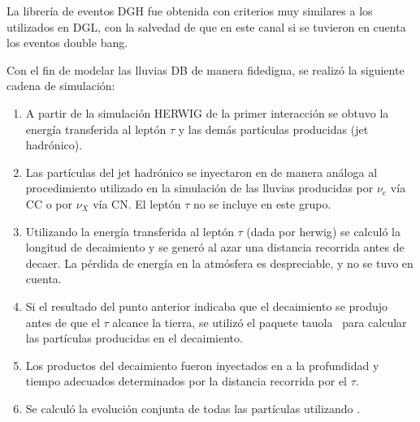 		La librería de eventos DGH fue obtenida con criterios muy similares a los utilizados en DGL, con la salvedad de que en este canal si se tuvieron en cuenta los eventos double bang.
		
		Con el fin de modelar las lluvias DB de manera fidedigna, se realizó la siguiente cadena de simulación:
		\begin{enumerate}
		\item A partir de la simulación HERWIG de la primer interacción se obtuvo la energía transferida al leptón $\tau$ y las demás partículas producidas (jet hadrónico).
		\item Las partículas del jet hadrónico se inyectaron en \aires{} de manera análoga al procedimiento utilizado en la simulación de las lluvias producidas por $\nu_{e}$ vía CC o por $\nu_{X}$ vía CN. El leptón $\tau$ no se incluye en este grupo.
		\item Utilizando la energía transferida al leptón $\tau$ (dada por {\sc herwig}) se calculó la longitud de decaimiento y se generó al azar una distancia recorrida antes de decaer. La pérdida de energía en la atmósfera es despreciable, y no se tuvo en cuenta.
		\item Si el resultado del punto anterior indicaba que el decaimiento se produjo antes de que el $\tau$ alcance la tierra, se utilizó el paquete {\sc tauola}~\cite{cite:TAUOLA} para calcular las partículas producidas en el decaimiento.%
		\item Los productos del decaimiento fueron inyectados en \aires{} a la profundidad y tiempo adecuados determinados por la distancia recorrida por el $\tau$.
		\item Se calculó la evolución conjunta de todas las partículas utilizando \aires{}.
		\end{enumerate}
		
